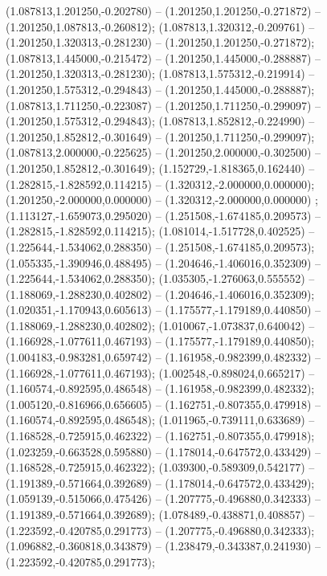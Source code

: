  (1.087813,1.201250,-0.202780) -- (1.201250,1.201250,-0.271872) -- (1.201250,1.087813,-0.260812);
 (1.087813,1.320312,-0.209761) -- (1.201250,1.320313,-0.281230) -- (1.201250,1.201250,-0.271872);
 (1.087813,1.445000,-0.215472) -- (1.201250,1.445000,-0.288887) -- (1.201250,1.320313,-0.281230);
 (1.087813,1.575312,-0.219914) -- (1.201250,1.575312,-0.294843) -- (1.201250,1.445000,-0.288887);
 (1.087813,1.711250,-0.223087) -- (1.201250,1.711250,-0.299097) -- (1.201250,1.575312,-0.294843);
 (1.087813,1.852812,-0.224990) -- (1.201250,1.852812,-0.301649) -- (1.201250,1.711250,-0.299097);
 (1.087813,2.000000,-0.225625) -- (1.201250,2.000000,-0.302500) -- (1.201250,1.852812,-0.301649);
 (1.152729,-1.818365,0.162440) -- (1.282815,-1.828592,0.114215) -- (1.320312,-2.000000,0.000000);
 (1.201250,-2.000000,0.000000) -- (1.320312,-2.000000,0.000000) ;
 (1.113127,-1.659073,0.295020) -- (1.251508,-1.674185,0.209573) -- (1.282815,-1.828592,0.114215);
 (1.081014,-1.517728,0.402525) -- (1.225644,-1.534062,0.288350) -- (1.251508,-1.674185,0.209573);
 (1.055335,-1.390946,0.488495) -- (1.204646,-1.406016,0.352309) -- (1.225644,-1.534062,0.288350);
 (1.035305,-1.276063,0.555552) -- (1.188069,-1.288230,0.402802) -- (1.204646,-1.406016,0.352309);
 (1.020351,-1.170943,0.605613) -- (1.175577,-1.179189,0.440850) -- (1.188069,-1.288230,0.402802);
 (1.010067,-1.073837,0.640042) -- (1.166928,-1.077611,0.467193) -- (1.175577,-1.179189,0.440850);
 (1.004183,-0.983281,0.659742) -- (1.161958,-0.982399,0.482332) -- (1.166928,-1.077611,0.467193);
 (1.002548,-0.898024,0.665217) -- (1.160574,-0.892595,0.486548) -- (1.161958,-0.982399,0.482332);
 (1.005120,-0.816966,0.656605) -- (1.162751,-0.807355,0.479918) -- (1.160574,-0.892595,0.486548);
 (1.011965,-0.739111,0.633689) -- (1.168528,-0.725915,0.462322) -- (1.162751,-0.807355,0.479918);
 (1.023259,-0.663528,0.595880) -- (1.178014,-0.647572,0.433429) -- (1.168528,-0.725915,0.462322);
 (1.039300,-0.589309,0.542177) -- (1.191389,-0.571664,0.392689) -- (1.178014,-0.647572,0.433429);
 (1.059139,-0.515066,0.475426) -- (1.207775,-0.496880,0.342333) -- (1.191389,-0.571664,0.392689);
 (1.078489,-0.438871,0.408857) -- (1.223592,-0.420785,0.291773) -- (1.207775,-0.496880,0.342333);
 (1.096882,-0.360818,0.343879) -- (1.238479,-0.343387,0.241930) -- (1.223592,-0.420785,0.291773);
